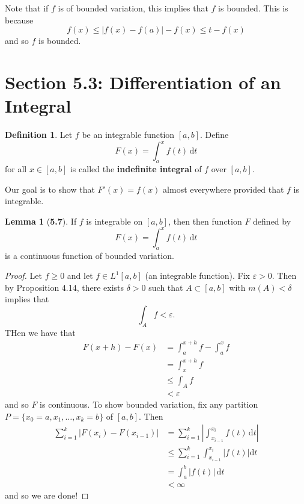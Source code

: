 \documentclass[12pt]{article}
\renewcommand{\epsilon}{\varepsilon}
\theoremstyle{definition}
\newtheorem*{definition}{Definition}
\newtheorem*{lemma}{Lemma}
\begin{document}
Note that if \( f \) is of bounded variation, this implies that \( f \) is bounded. This is because
    \[
        f(x) \leq |f(x) - f(a)| - f(x) \leq t - f(x)
    \]
and so \( f \) is bounded.

\section*{Section 5.3: Differentiation of an Integral}

\begin{definition}
    Let \( f \) be an integrable function \( [a, b] \). Define
        \[
            F(x) = \int_{a}^{x} f(t) \, \mathrm{d}t  
        \]
    for all \( x \in [a,b] \) is called the \textbf{indefinite integral} of \( f \) over \( [a,b] \).
\end{definition}

Our goal is to show that \( F'(x) = f(x) \) almost everywhere provided that \( f \) is integrable. 

\begin{lemma}[\textbf{5.7}]

    If \( f \) is integrable on \( [a, b] \), then then function \( F \) defined by
        \[
            F(x) = \int_{a}^{x} f(t) \, \mathrm{d}t  
        \]
    is a continuous function of bounded variation. 

        \begin{proof}
            Let \( f \geq 0 \) and let \( f \in L^{1}[a,b] \) (an integrable function). Fix \( \epsilon > 0 \). Then by Proposition 4.14, there exists \( \delta > 0 \) such that \( A \subset [a,b] \) with \( m(A) < \delta \) implies that
                \[
                    \int_{A} f < \epsilon.
                \]
            THen we have that 
                \begin{align*}
                    F(x + h) - F(x) &= \int_{a}^{x+h}f - \int_{a}^{x} f \\ 
                    &= \int_{x}^{x + h} f \\
                    &\leq \int_{A} f \\
                    &< \epsilon
                \end{align*}
            and so \( F \) is continuous. To show bounded variation, fix any partition \( P = \{x_0 = a, x_1, \ldots, x_k = b \} \) of \( [a,b] \).
            Then 
                \begin{align*}
                    \sum_{i=1}^{k}\left| F(x_i) - F(x_{i-1}) \right| &= \sum_{i=1}^{k} \left| \int_{x_{i-1}}^{x_{i}} f(t) \, \mathrm{d} t\right| \\
                    &\leq \sum_{i=1}^{k} \int_{x_{i-1}}^{x_{i}} \left| f(t) \right| \mathrm{d}t  \\
                    &= \int_{a}^{b} |f(t)| \, \mathrm{d}t \\
                    &< \infty
                \end{align*}
            and so we are done!
        \end{proof}
\end{lemma}
\end{document}
